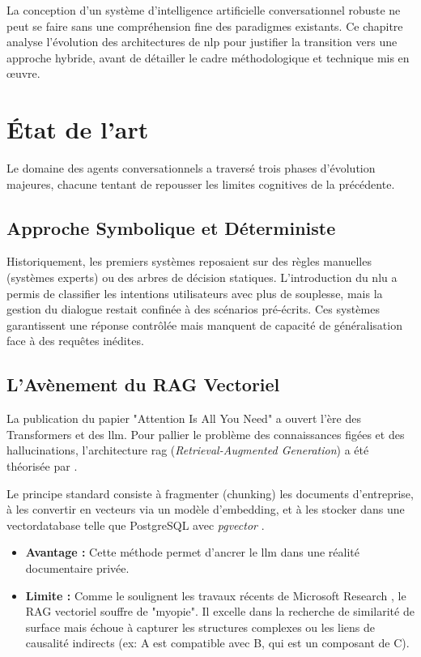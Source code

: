 La conception d'un système d'intelligence artificielle conversationnel robuste ne peut se faire sans une compréhension fine des paradigmes existants. Ce chapitre analyse l'évolution des architectures de \gls{nlp} pour justifier la transition vers une approche hybride, avant de détailler le cadre méthodologique et technique mis en œuvre.

\section{État de l'art}

Le domaine des agents conversationnels a traversé trois phases d'évolution majeures, chacune tentant de repousser les limites cognitives de la précédente.

\subsection{Approche Symbolique et Déterministe}
Historiquement, les premiers systèmes reposaient sur des règles manuelles (systèmes experts) ou des arbres de décision statiques. L'introduction du \gls{nlu} a permis de classifier les intentions utilisateurs avec plus de souplesse, mais la gestion du dialogue restait confinée à des scénarios pré-écrits. Ces systèmes garantissent une réponse contrôlée mais manquent de capacité de généralisation face à des requêtes inédites.

\subsection{L'Avènement du RAG Vectoriel}
La publication du papier "Attention Is All You Need" \cite{vaswani2017} a ouvert l'ère des Transformers et des \gls{llm}. Pour pallier le problème des connaissances figées et des hallucinations, l'architecture \gls{rag} (\textit{Retrieval-Augmented Generation}) a été théorisée par \cite{lewis2020}.

Le principe standard consiste à fragmenter (\gls{chunking}) les documents d'entreprise, à les convertir en vecteurs via un modèle d'\gls{embedding}, et à les stocker dans une \gls{vectordatabase} telle que PostgreSQL avec \textit{pgvector} \cite{pgvector}.
\begin{itemize}
    \item \textbf{Avantage :} Cette méthode permet d'ancrer le \gls{llm} dans une réalité documentaire privée.
    \item \textbf{Limite :} Comme le soulignent les travaux récents de Microsoft Research \cite{edge2024}, le RAG vectoriel souffre de "myopie". Il excelle dans la recherche de similarité de surface mais échoue à capturer les structures complexes ou les liens de causalité indirects (ex: A est compatible avec B, qui est un composant de C).
\end{itemize}

